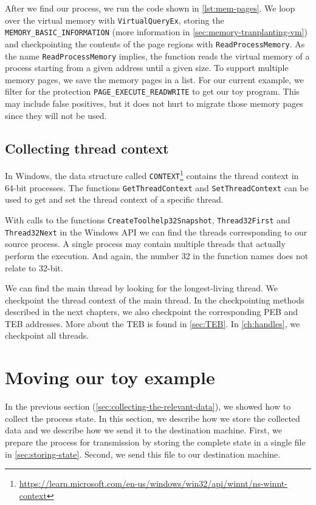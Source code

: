 \documentclass[a4paper, 11pt, english]{report}
\begin{document}
After we find our process, we run the code shown in \autoref{lst:mem-pages}. We loop over the virtual memory with \texttt{VirtualQueryEx}, storing the \texttt{MEMORY\_BASIC\_INFORMATION} (more information in \autoref{sec:memory-tranplanting-vm}) and checkpointing the contents of the page regions with \texttt{ReadProcessMemory}. As the name \texttt{ReadProcessMemory} implies, the function reads the virtual memory of a process starting from a given address until a given size. To support multiple memory pages, we save the memory pages in a list. For our current example, we filter for the protection \texttt{PAGE\_EXECUTE\_READWRITE} to get our toy program. This may include false positives, but it does not hurt to migrate those memory pages since they will not be used.

\subsection{Collecting thread context}
\label{sec:collecting-thread-context}
In Windows, the data structure called \texttt{CONTEXT}\footnote{\url{https://learn.microsoft.com/en-us/windows/win32/api/winnt/ns-winnt-context}} contains the thread context in 64-bit processes. The functions \texttt{GetThreadContext} and \texttt{SetThreadContext} can be used to get and set the thread context of a specific thread.

With calls to the functions \texttt{CreateToolhelp32Snapshot}, \texttt{Thread32First} and \texttt{Thread32Next} in the Windows API we can find the threads corresponding to our source process.
A single process may contain multiple threads that actually perform the execution.
And again, the number 32 in the function names does not relate to 32-bit. 

We can find the main thread by looking for the longest-living thread. We checkpoint the thread context of the main thread. In the checkpointing methods described in the next chapters, we also checkpoint the corresponding PEB and TEB addresses. More about the TEB is found in \autoref{sec:TEB}. In \autoref{ch:handles}, we checkpoint all threads.

\section{Moving our toy example}
\label{sec:moving-shellcode}
In the previous section (\autoref{sec:collecting-the-relevant-data}), we showed how to collect the process state. In this section, we describe how we store the collected data and we describe how we send it to the destination machine. First, we prepare the process for transmission by storing the complete state in a single file in \autoref{sec:storing-state}. Second, we send this file to our destination machine.
\end{document}
